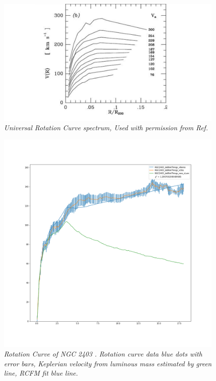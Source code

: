 \documentclass[reprint,%
 amsmath,amssymb,
 aps,
]{revtex4-1}
\begin{document}
  
 \begin{figure}[h!]
     \centering
     \includegraphics[width=\linewidth]{URC}
     \caption{\emph{Universal Rotation Curve spectrum, Used with permission from Ref.\citep{salucci}}}
     \label{fig:URC}
\end{figure}
  

  
    
 \begin{figure}[h!]
      \centering
      \includegraphics[width=\linewidth]{NGC2403_deBlokThings_XueSofue}
      \caption{\emph{Rotation Curve of NGC 2403 \cite{Blok1}.   Rotation curve data blue dots with  error bars,  Keplerian velocity from luminous mass estimated by   green line,   RCFM fit blue line.} }
      \label{fig:NGC2403}
  \end{figure}
\end{document}
